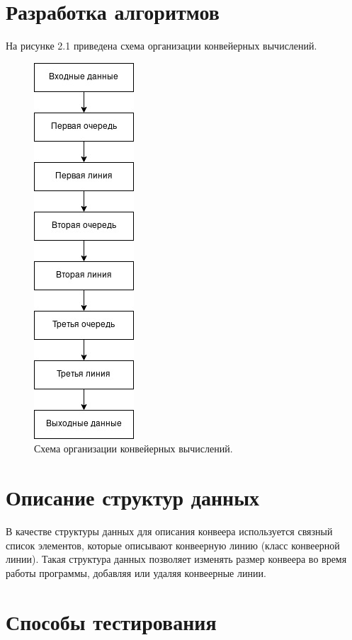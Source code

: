 \documentclass[12pt]{report}
\begin{document}
\section{Разработка алгоритмов}
На рисунке 2.1 приведена схема организации конвейерных вычислений.

\begin{figure}[H]
	\centering
	\includegraphics[scale=0.7]{imgs/scheme_lab05.jpg}
	\caption{Схема организации конвейерных вычислений.}
	\label{fig:mpr}
\end{figure}

\section{Описание структур данных}

В качестве структуры данных для описания конвеера используется связный список элементов, которые описывают конвеерную линию (класс конвеерной линии). Такая структура данных позволяет изменять размер конвеера во время работы программы, добавляя или удаляя конвеерные линии.

\section{Способы тестирования}
\end{document}
